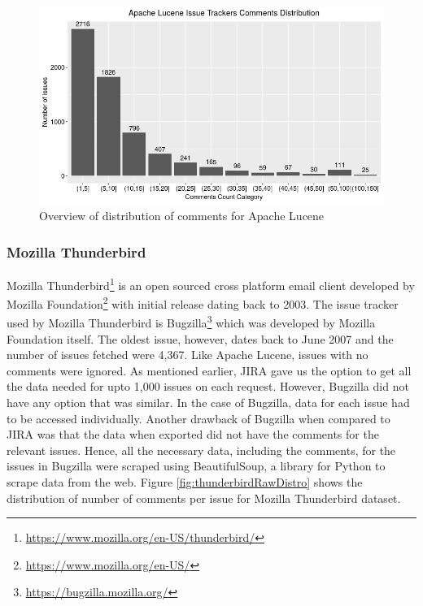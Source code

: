 \documentclass[a4paper,12pt,twoside]{report}
\begin{document}
\begin{figure}[h] %
    \centering
    \includegraphics[width=13cm]{lucene-comment-distribution-raw}
    \caption{Overview of distribution of comments for Apache Lucene}
    \label{fig:luceneRawDistro}
\end{figure}

\subsubsection{Mozilla Thunderbird}
Mozilla Thunderbird\footnote{\url{https://www.mozilla.org/en-US/thunderbird/}} is an open sourced cross platform email client developed by Mozilla Foundation\footnote{\url{https://www.mozilla.org/en-US/}} with initial release dating back to 2003. The issue tracker used by Mozilla Thunderbird is Bugzilla\footnote{\url{https://bugzilla.mozilla.org/}} which was developed by Mozilla Foundation itself. The oldest issue, however, dates back to June 2007 and the number of issues fetched were 4,367. Like Apache Lucene, issues with no comments were ignored. 
\newline \newline
As mentioned earlier, JIRA gave us the option to get all the data needed for upto 1,000 issues on each request. However, Bugzilla did not have any option that was similar. In the case of Bugzilla, data for each issue had to be accessed individually. Another drawback of Bugzilla when compared to JIRA was that the data when exported did not have the comments for the relevant issues. Hence, all the necessary data, including the comments, for the issues in Bugzilla were scraped using BeautifulSoup, a library for Python to scrape data from the web. Figure \ref{fig:thunderbirdRawDistro} shows the distribution of number of comments per issue for Mozilla Thunderbird dataset. 
\end{document}
